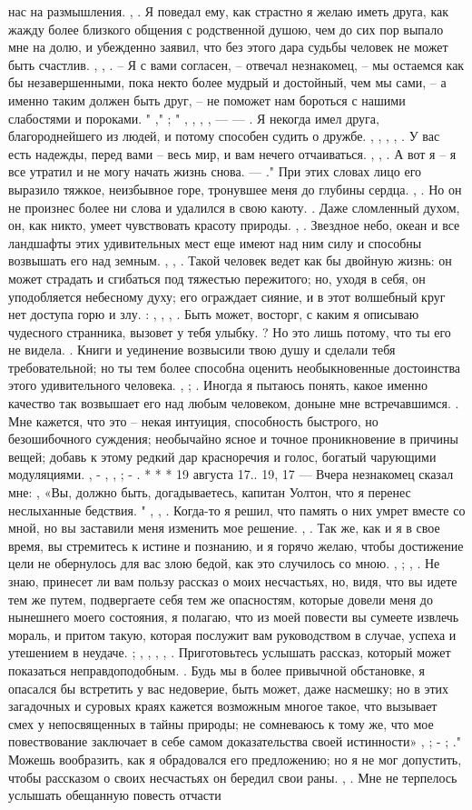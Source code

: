 нас на размышления. , . Я поведал ему, как страстно я желаю иметь друга, как жажду более близкого общения с родственной душою, чем до сих пор выпало мне на долю, и убежденно заявил, что без этого дара судьбы человек не может быть счастлив. , , . – Я с вами согласен, – отвечал незнакомец, – мы остаемся как бы незавершенными, пока некто более мудрый и достойный, чем мы сами, – а именно таким должен быть друг, – не поможет нам бороться с нашими слабостями и пороками. " ," ; " , , , , — — . Я некогда имел друга, благороднейшего из людей, и потому способен судить о дружбе. , , , , . У вас есть надежды, перед вами – весь мир, и вам нечего отчаиваться. , , . А вот я – я все утратил и не могу начать жизнь снова. — ." При этих словах лицо его выразило тяжкое, неизбывное горе, тронувшее меня до глубины сердца. , . Но он не произнес более ни слова и удалился в свою каюту. . Даже сломленный духом, он, как никто, умеет чувствовать красоту природы. , . Звездное небо, океан и все ландшафты этих удивительных мест еще имеют над ним силу и способны возвышать его над земным. , , . Такой человек ведет как бы двойную жизнь: он может страдать и сгибаться под тяжестью пережитого; но, уходя в себя, он уподобляется небесному духу; его ограждает сияние, и в этот волшебный круг нет доступа горю и злу. : , , , . Быть может, восторг, с каким я описываю чудесного странника, вызовет у тебя улыбку. ? Но это лишь потому, что ты его не видела. . Книги и уединение возвысили твою душу и сделали тебя требовательной; но ты тем более способна оценить необыкновенные достоинства этого удивительного человека. , ; . Иногда я пытаюсь понять, какое именно качество так возвышает его над любым человеком, доныне мне встречавшимся. . Мне кажется, что это – некая интуиция, способность быстрого, но безошибочного суждения; необычайно ясное и точное проникновение в причины вещей; добавь к этому редкий дар красноречия и голос, богатый чарующими модуляциями. , - , , ; - . * * * 19 августа 17.. 19, 17 — Вчера незнакомец сказал мне: , «Вы, должно быть, догадываетесь, капитан Уолтон, что я перенес неслыханные бедствия. " , , . Когда-то я решил, что память о них умрет вместе со мной, но вы заставили меня изменить мое решение. , . Так же, как и я в свое время, вы стремитесь к истине и познанию, и я горячо желаю, чтобы достижение цели не обернулось для вас злою бедой, как это случилось со мною. , ; , . Не знаю, принесет ли вам пользу рассказ о моих несчастьях, но, видя, что вы идете тем же путем, подвергаете себя тем же опасностям, которые довели меня до нынешнего моего состояния, я полагаю, что из моей повести вы сумеете извлечь мораль, и притом такую, которая послужит вам руководством в случае, успеха и утешением в неудаче. ; , , , , . Приготовьтесь услышать рассказ, который может показаться неправдоподобным. . Будь мы в более привычной обстановке, я опасался бы встретить у вас недоверие, быть может, даже насмешку; но в этих загадочных и суровых краях кажется возможным многое такое, что вызывает смех у непосвященных в тайны природы; не сомневаюсь к тому же, что мое повествование заключает в себе самом доказательства своей истинности» , ; - ; ." Можешь вообразить, как я обрадовался его предложению; но я не мог допустить, чтобы рассказом о своих несчастьях он бередил свои раны. , . Мне не терпелось услышать обещанную повесть отчасти 